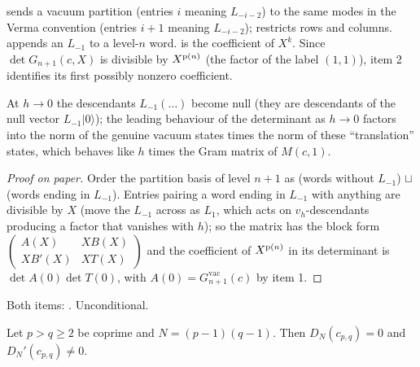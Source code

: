\begin{dictionary}
 sends a vacuum partition (entries $i$ meaning $L_{-i-2}$) to the same
modes in the Verma convention (entries $i+1$ meaning $L_{-i-2}$);  restricts rows and
columns.  appends an $L_{-1}$ to a level-$n$ word.  is the
coefficient of $X^k$. Since $\det G_{n+1}(c,X)$ is divisible by $X^{\mathrm{p}(n)}$ (the factor of the label
$(1,1)$), item 2 identifies its first possibly nonzero coefficient.
\end{dictionary}

\begin{physics}
At $h\to0$ the descendants $L_{-1}(\dots)$ become null (they are descendants of the null vector
$L_{-1}|0\rangle$); the leading behaviour of the determinant as $h\to0$ factors into the norm of the
genuine vacuum states times the norm of these ``translation'' states, which behaves like $h$ times the
Gram matrix of $M(c,1)$.
\end{physics}

\begin{proof}[Proof on paper]
Order the partition basis of level $n+1$ as (words without $L_{-1}$) $\sqcup$ (words ending in $L_{-1}$).
Entries pairing a word ending in $L_{-1}$ with anything are divisible by $X$ (move the $L_{-1}$ across as
$L_1$, which acts on $v_h$-descendants producing a factor that vanishes with $h$); so the matrix has the
block form $\begin{pmatrix}A(X) & XB(X)\\ XB'(X) & XT(X)\end{pmatrix}$ and the coefficient of $X^{\mathrm{p}(n)}$
in its determinant is $\det A(0)\det T(0)$, with $A(0) = G^{\mathrm{vac}}_{n+1}(c)$ by item 1.
\end{proof}

\begin{status}
Both items: \lean{[propext, Classical.}\allowbreak{}\allowbreak\lean{sound]}. Unconditional.
\end{status}

\begin{theorem}\label{l06:thm:vacsimple}
Let $p>q\ge2$ be coprime and $N = (p-1)(q-1)$. Then $D_N(c_{p,q}) = 0$ and $D_N'(c_{p,q})\ne0$.
\end{theorem}

